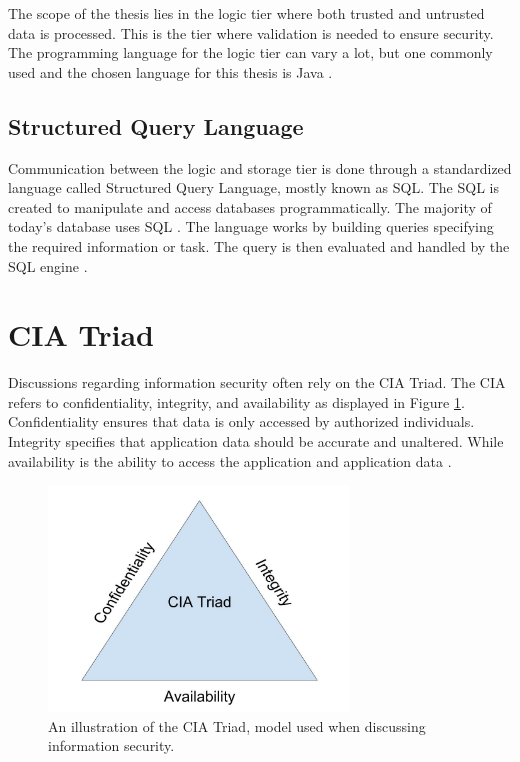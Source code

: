 The scope of the thesis lies in the logic tier where both trusted and untrusted data is processed. This is the tier where validation is needed to ensure security. The programming language for the logic tier can vary a lot, but one commonly used and the chosen language for this thesis is Java \parencite{Survey}.



\subsection{Structured Query Language}
Communication between the logic and storage tier is done through a standardized language called Structured Query Language, mostly known as SQL. The SQL is created to manipulate and access databases programmatically. The majority of today's database uses SQL \parencite{Survey}. The language works by building queries specifying the required information or task. The query is then evaluated and handled by the SQL engine \parencite{DarieCristian2003TPGt}.



\section{CIA Triad}
\label{cia}
Discussions regarding information security often rely on the CIA Triad. The CIA refers to confidentiality, integrity, and availability as displayed in Figure \ref{fig:CIATriad}. Confidentiality ensures that data is only accessed by authorized individuals. Integrity specifies that application data should be accurate and unaltered. While availability is the ability to access the application and application data \parencite{2014C1-W}.

\begin{figure}[H]
    \centering
    \includegraphics[height=6cm]{images/CIATriad.jpg}
    \caption{An illustration of the CIA Triad, model used when discussing information security.}
    \label{fig:CIATriad}
\end{figure}



